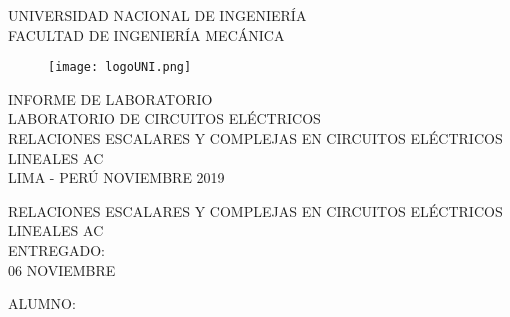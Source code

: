 \documentclass[a4paper,12pt]{report}
\begin{document}
\setcounter{page}{1}
\thispagestyle{empty}
\begin{center}
{\huge UNIVERSIDAD NACIONAL DE INGENIERÍA}\\[0.9cm]
{\Large FACULTAD DE INGENIERÍA MECÁNICA}\\[0.6in]
\end{center}
\begin{figure}[h]
\begin{center}
\texttt{[image: logoUNI.png]}
\vspace{0cm}
\end{center}
\end{figure}
\vspace{0.5cm}
\begin{center}
INFORME DE LABORATORIO\\
LABORATORIO DE CIRCUITOS ELÉCTRICOS\\[5mm]
{\large RELACIONES ESCALARES Y COMPLEJAS EN CIRCUITOS ELÉCTRICOS LINEALES AC}\\[10mm]
\vfill
LIMA - PERÚ \hfill NOVIEMBRE 2019
\end{center}
\newpage
\thispagestyle{empty}
\begin{center}
{\Huge RELACIONES ESCALARES Y COMPLEJAS EN CIRCUITOS ELÉCTRICOS LINEALES AC}\\[0.7cm]
\small ENTREGADO:\\[0.05cm]
\small 06 NOVIEMBRE\\[1.2cm]
\end{center}
\begin{flushleft}
{\large ALUMNO:}\\[2cm]
\end{flushleft}
\end{document}
